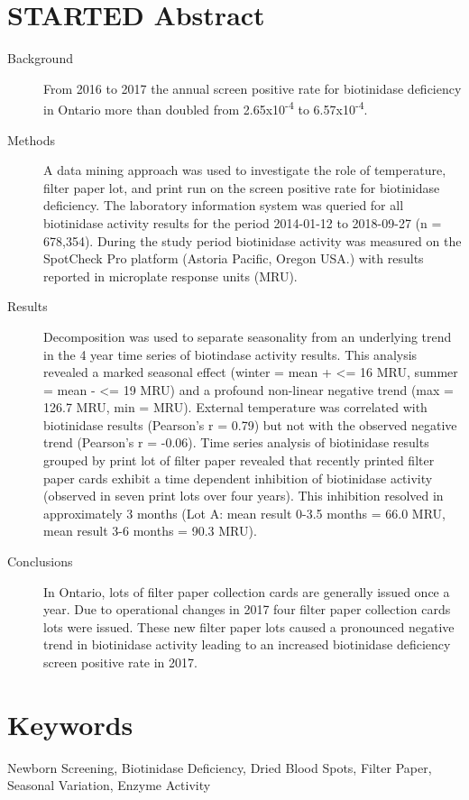 \documentclass[review]{elsarticle}
\begin{document}
\section*{STARTED Abstract}
\label{sec:org73e056a}
\begin{description}
\item[{Background}] From 2016 to 2017 the annual screen positive rate for
biotinidase deficiency in Ontario more than doubled from
2.65x10\textsuperscript{-4} to 6.57x10\textsuperscript{-4}.

\item[{Methods}] A data mining approach was used to investigate the role
of temperature, filter paper lot, and print run on the screen
positive rate for biotinidase deficiency. The laboratory information
system was queried for all biotinidase activity results for the
period 2014-01-12 to 2018-09-27 (n = 678,354). During the study
period biotinidase activity was measured on the SpotCheck Pro
platform (Astoria Pacific, Oregon USA.) with results reported in
microplate response units (MRU).

\item[{Results}] Decomposition was used to separate seasonality from an
underlying trend in the 4 year time series of biotindase activity
results. This analysis revealed a marked seasonal effect (winter =
mean + <= 16 MRU, summer = mean - <= 19 MRU) and a profound
non-linear negative trend (max = 126.7 MRU, min = MRU). External
temperature was correlated with biotinidase results (Pearson's r =
0.79) but not with the observed negative trend (Pearson's r =
-0.06). Time series analysis of biotinidase results grouped by print
lot of filter paper revealed that recently printed filter paper
cards exhibit a time dependent inhibition of biotinidase activity
(observed in seven print lots over four years). This inhibition
resolved in approximately 3 months (Lot A: mean result 0-3.5 months
= 66.0 MRU, mean result 3-6 months = 90.3 MRU).

\item[{Conclusions}] In Ontario, lots of filter paper collection cards are
generally issued once a year. Due to operational changes in 2017
four filter paper collection cards lots were issued. These new
filter paper lots caused a pronounced negative trend in biotinidase
activity leading to an increased biotinidase deficiency screen
positive rate in 2017.
\end{description}

\section*{Keywords}
\label{sec:orgc0d6044}
Newborn Screening, Biotinidase Deficiency, Dried Blood Spots, Filter
Paper, Seasonal Variation, Enzyme Activity
\end{document}
